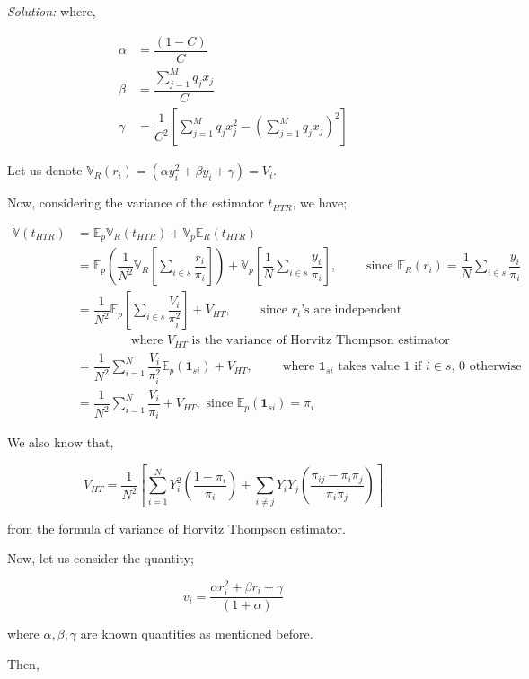 \documentclass[12pt]{article}
\newcommand{\E}{\mathbb{E}}
\newcommand{\Var}{\mathbb{V}}
\theoremstyle{definition}
\newenvironment{answer}{\textit{Solution: }\quad }{ \hfill \qedsymbol}
\begin{document}
\begin{answer}
	where,

	\begin{align*}
		\alpha & = \dfrac{(1-C)}{C}\\
		\beta & = \dfrac{\sum_{j=1}^{M}q_jx_j}{C}\\
		\gamma & = \dfrac{1}{C^2} \left[ \sum_{j=1}^{M}q_jx_j^2 - \left( \sum_{j=1}^{M}q_jx_j \right)^2 \right] 
	\end{align*}

	Let us denote $\Var_R(r_i) = (\alpha y_i^2 + \beta y_i + \gamma) = V_i$.

	Now, considering the variance of the estimator $t_{HTR}$, we have;

	\begin{align*}
		\Var(t_{HTR})
		& = \E_p \Var_R(t_{HTR}) + \Var_p \E_R(t_{HTR})\\
		& = \E_p \left(\dfrac{1}{N^2} \Var_R \left[ \sum_{i \in s} \dfrac{r_i}{\pi_i} \right] \right) + \Var_p \left[ \dfrac{1}{N} \sum_{i \in s} \dfrac{y_i}{\pi_i} \right], \qquad \text{ since } \E_R(r_i) = \dfrac{1}{N} \sum_{i \in s} \dfrac{y_i}{\pi_i}\\
		& = \dfrac{1}{N^2} \E_p \left[ \sum_{i \in s} \dfrac{V_i}{\pi_i^2} \right] + V_{HT}, \qquad \text{ since } r_i\text{'s are independent} \\
		& \qquad \qquad \text{ where } V_{HT} \text{ is the variance of Horvitz Thompson estimator}\\
		& = \dfrac{1}{N^2} \sum_{i = 1}^{N} \dfrac{V_i}{\pi_i^2} \E_p(\bm{1}_{si}) + V_{HT}, \qquad \text{ where } \bm{1}_{si} \text{ takes value 1 if } i \in s \text{, 0 otherwise}\\
		& = \dfrac{1}{N^2} \sum_{i = 1}^{N} \dfrac{V_i}{\pi_i} + V_{HT}, \text{ since } \E_p(\bm{1}_{si}) = \pi_i
	\end{align*}

	We also know that,

	$$V_{HT} = \dfrac{1}{N^2} \left[\sum_{i = 1}^{N} Y_i^2 \left(\dfrac{1 - \pi_i}{\pi_i}\right) + \sum_{i \neq j} Y_i Y_j \left(\dfrac{\pi_{ij} - \pi_i \pi_j}{\pi_i \pi_j}\right)\right] $$

	from the formula of variance of Horvitz Thompson estimator.

	Now, let us consider the quantity;

	$$v_i = \dfrac{\alpha r_i^2 + \beta r_i + \gamma}{(1 + \alpha)}$$

	where $\alpha, \beta, \gamma$ are known quantities as mentioned before.

	Then,


\end{answer}
\end{document}
